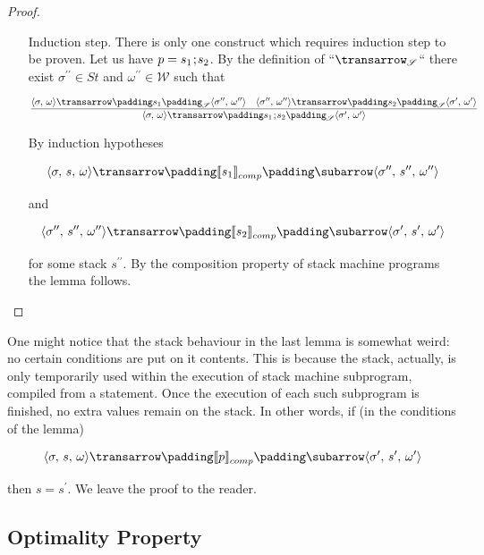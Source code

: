 \begin{proof}
\begin{itemize}
    \[
    \trans{\inbr{\sigma,\,s,\,\omega}}{\sembr{e}^\mathscr{E}_{comp}\dplus[\llang{ST$\,x$}]}{\inbr{\sigma\,[x\gets\sembr{e}^\ph_\mathscr{E}\,\sigma],\,s,\,\omega}}
    \]

    which completes the proof for the base case.
    
  \item[Induction step.] There is only one construct which requires induction step to be proven. Let us have $p=s_1\llang{;}s_2$.
    By the definition of ``${\setsubarrow{_\mathscr{S}}\transrel}$`` there exist $\sigma^{\prime\prime}\in St$ and $\omega^{\prime\prime}\in\mathscr{W}$ such that

    \[
      {\setsubarrow{_\mathscr{S}}
        \trule{\trans{\inbr{\sigma,\,\omega}}{s_1}{\inbr{\sigma^{\prime\prime},\,\omega^{\prime\prime}}}\quad\trans{\inbr{\sigma^{\prime\prime},\,\omega^{\prime\prime}}}{s_2}{\inbr{\sigma^\prime,\,\omega^\prime}}}
              {\trans{\inbr{\sigma,\,\omega}}{s_1\llang{;}s_2}{\inbr{\sigma^\prime,\,\omega^\prime}}}}      
    \]

    By induction hypotheses 

    \[
    \trans{\inbr{\sigma,\,s,\,\omega}}{\sembr{s_1}^\ph_{comp}}{\inbr{\sigma^{\prime\prime},\,s^{\prime\prime},\,\omega^{\prime\prime}}}
    \]

    and

    \[
    \trans{\inbr{\sigma^{\prime\prime},\,s^{\prime\prime},\,\omega^{\prime\prime}}}{\sembr{s_2}^\ph_{comp}}{\inbr{\sigma^\prime,\,s^\prime,\,\omega^\prime}}
    \]

    for some stack $s^{\prime\prime}$. By the composition property of stack machine programs the lemma follows.    
  \end{itemize}
\end{proof}

One might notice that the stack behaviour in the last lemma is somewhat weird: no certain conditions are put on it contents. This is because the stack, actually, is only temporarily
used within the execution of stack machine subprogram, compiled from a statement. Once the execution of each such subprogram is finished, no extra values remain on the stack. In
other words, if (in the conditions of the lemma)

\[
\trans{\inbr{\sigma,\,s,\,\omega}}{\sembr{p}^\ph_{comp}}{\inbr{\sigma^\prime,\,s^\prime,\,\omega^\prime}}
\]

then $s=s^\prime$. We leave the proof to the reader.

\subsection{Optimality Property}


